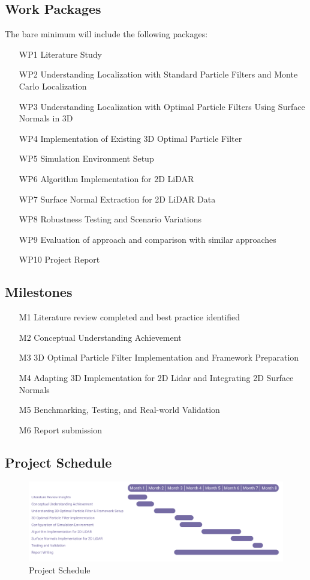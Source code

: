 \documentclass[rnd]{mas_proposal}
\begin{document}
\subsection{Work Packages}
The bare minimum will include the following packages:
\begin{enumerate}
    \item[WP1] Literature Study
    \item[WP2] Understanding Localization with Standard Particle Filters and Monte Carlo Localization
    \item[WP3] Understanding Localization with Optimal Particle Filters Using Surface Normals in 3D
    \item[WP4] Implementation of Existing 3D Optimal Particle Filter
    \item[WP5] Simulation Environment Setup
    \item[WP6] Algorithm Implementation for 2D LiDAR
    \item[WP7] Surface Normal Extraction for 2D LiDAR Data
    \item[WP8] Robustness Testing and Scenario Variations
    \item[WP9] Evaluation of approach and comparison with similar approaches
    \item[WP10] Project Report
\end{enumerate}

\subsection{Milestones}

\begin{enumerate}
    \item[M1] Literature review completed and best practice identified
    \item[M2] Conceptual Understanding Achievement
    \item[M3] 3D Optimal Particle Filter Implementation and Framework Preparation
    \item[M4] Adapting 3D Implementation for 2D Lidar and Integrating 2D Surface Normals
    \item[M5] Benchmarking, Testing, and Real-world Validation
    \item[M6] Report submission
\end{enumerate}
\newpage
\subsection{Project Schedule}
\FloatBarrier
\begin{figure}[h!]
    \includegraphics[width=\textwidth]{images/Timeline.png}
    \caption{Project Schedule}
    \label{fig:myfigure}
\end{figure}
\FloatBarrier
\end{document}
